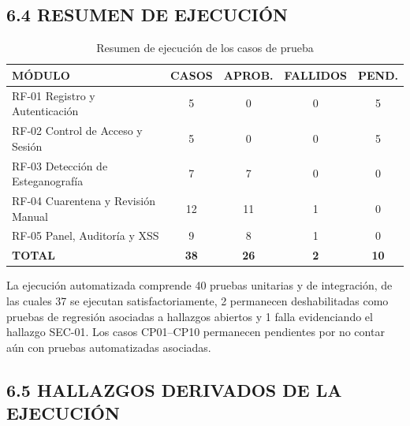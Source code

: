 \subsection{6.4 RESUMEN DE EJECUCIÓN}

\begin{table}[H]
\centering
\caption{Resumen de ejecución de los casos de prueba}
\label{tab:resumen}
\begin{tabular}{|p{5.5cm}|c|c|c|c|}
\hline
\textbf{MÓDULO} & \textbf{CASOS} & \textbf{APROB.} & \textbf{FALLIDOS} & \textbf{PEND.} \\
\hline
RF-01 Registro y Autenticación & 5 & 0 & 0 & 5 \\
\hline
RF-02 Control de Acceso y Sesión & 5 & 0 & 0 & 5 \\
\hline
RF-03 Detección de Esteganografía & 7 & 7 & 0 & 0 \\
\hline
RF-04 Cuarentena y Revisión Manual & 12 & 11 & 1 & 0 \\
\hline
RF-05 Panel, Auditoría y XSS & 9 & 8 & 1 & 0 \\
\hline
\textbf{TOTAL} & \textbf{38} & \textbf{26} & \textbf{2} & \textbf{10} \\
\hline
\end{tabular}
\end{table}

La ejecución automatizada comprende 40 pruebas unitarias y de integración, de las cuales 37 se ejecutan satisfactoriamente, 2 permanecen deshabilitadas como pruebas de regresión asociadas a hallazgos abiertos y 1 falla evidenciando el hallazgo SEC-01. Los casos CP01--CP10 permanecen pendientes por no contar aún con pruebas automatizadas asociadas.

\subsection{6.5 HALLAZGOS DERIVADOS DE LA EJECUCIÓN}

